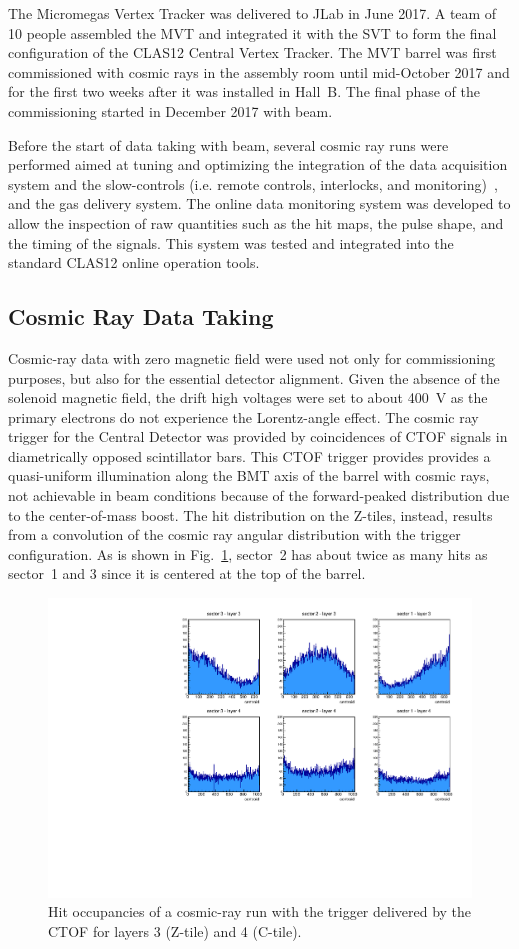 The Micromegas Vertex Tracker was delivered to JLab in June 2017. A team of 10 people assembled the MVT and integrated
it with the SVT to form the final configuration of the CLAS12 Central Vertex Tracker. The MVT barrel was first commissioned
with cosmic rays in the assembly room until mid-October 2017 and for the first two weeks after it was installed in Hall~B. The
final phase of the commissioning started in December 2017 with beam.

Before the start of data taking with beam, several cosmic ray runs were performed aimed at tuning and optimizing the
integration of the data acquisition system and the slow-controls (i.e. remote controls, interlocks, and 
monitoring)~\cite{daq-nim},
and the gas delivery system. The online data monitoring system was developed to allow the inspection of raw quantities such as the
hit maps, the pulse shape, and the timing of the signals. This system was tested and integrated into the standard CLAS12
online operation tools. 

\subsection{Cosmic Ray Data Taking}
\label{sec:cosmics}

Cosmic-ray data with zero magnetic field were used not only for commissioning purposes, but also for the essential detector
alignment. Given the absence of the solenoid magnetic field, the drift high voltages were set to about 400~V as the primary
electrons do not experience the Lorentz-angle effect. The cosmic ray trigger for the Central Detector was provided by
coincidences of CTOF signals in diametrically opposed scintillator bars. This CTOF trigger provides provides a quasi-uniform
illumination along the BMT axis of the barrel with cosmic rays, not achievable in beam conditions because of the forward-peaked
distribution due to the center-of-mass boost. The hit distribution on the Z-tiles, instead, results from a convolution of the cosmic
ray angular distribution with the trigger configuration. As is shown in Fig.~\ref{fig:mm-cosmic_occupancy}, sector~2 has about
twice as many hits as sector~1 and 3 since it is centered at the top of the barrel.

\begin{figure}[htb]
 \includegraphics[width=.45\textwidth]{images/BMT_hit_cosmics_CTOFtrigger.pdf}
 \caption{Hit occupancies of a cosmic-ray run with the trigger delivered by the CTOF for layers 3 (Z-tile) and 4 (C-tile).}
 \label{fig:mm-cosmic_occupancy}
\end{figure}

